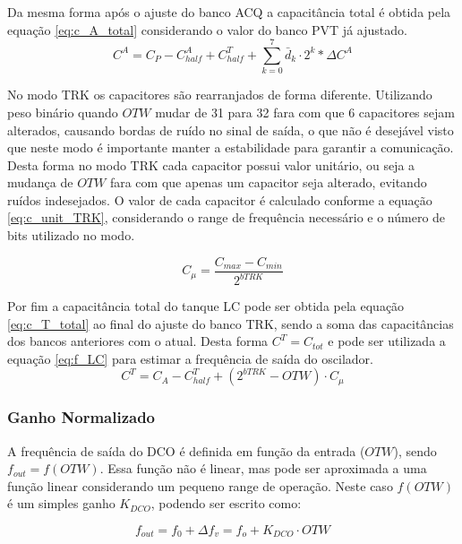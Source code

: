 Da mesma forma após o ajuste do banco ACQ a capacitância total é obtida pela equação \ref{eq:c_A_total} considerando o valor do banco PVT já ajustado.
\begin{equation}
	C^A = C_P - C^A_{half} + C^T_{half} + \sum_{k=0}^{7} \bar{d}_k \cdot 2^k * 	\Delta C^A
	\label{eq:c_A_total}
\end{equation}


No modo TRK os capacitores são rearranjados de forma diferente. Utilizando peso binário quando $OTW$ mudar de 31 para 32 fara com que 6 capacitores sejam alterados, causando bordas de ruído no sinal de saída, o que não é desejável visto que neste modo é importante manter a estabilidade para garantir a comunicação.   Desta forma no modo TRK cada capacitor possui valor unitário, ou seja a mudança de $OTW$ fara com que apenas um capacitor seja alterado, evitando ruídos indesejados. O valor de cada capacitor é calculado conforme a equação \ref{eq:c_unit_TRK}, considerando o range de frequência necessário e o número de bits utilizado no modo. 

\begin{equation}
	C_\mu = \frac{	C_{max} - C_{min}}{2^{bTRK}}
	\label{eq:c_unit_TRK}
\end{equation}

Por fim a capacitância total do tanque LC pode ser obtida pela equação \ref{eq:c_T_total} ao final do ajuste do banco TRK, sendo a soma das capacitâncias dos bancos anteriores com o atual. Desta forma $C^T = C_{tot}$ e pode ser utilizada a equação \ref{eq:f_LC} para estimar a frequência de saída do oscilador.
\begin{equation}
	C^T = C_A -  C^T_{half} + (2^{bTRK} - OTW) \cdot 	C_\mu
	\label{eq:c_T_total}
\end{equation}


\subsubsection{Ganho Normalizado}


A frequência de saída do DCO é definida em função da entrada ($OTW$), sendo $f_{out} = f(OTW)$. Essa função não é linear, mas pode ser aproximada a uma função linear considerando um pequeno range de operação. Neste caso $f(OTW)$ é um simples ganho $K_{DCO}$, podendo ser escrito como:

\begin{equation}
	f_{out} = f_0 + \Delta f_v = f_o + K_{DCO} \cdot OTW
	\label{eq:deltaf_ndco}
\end{equation}

